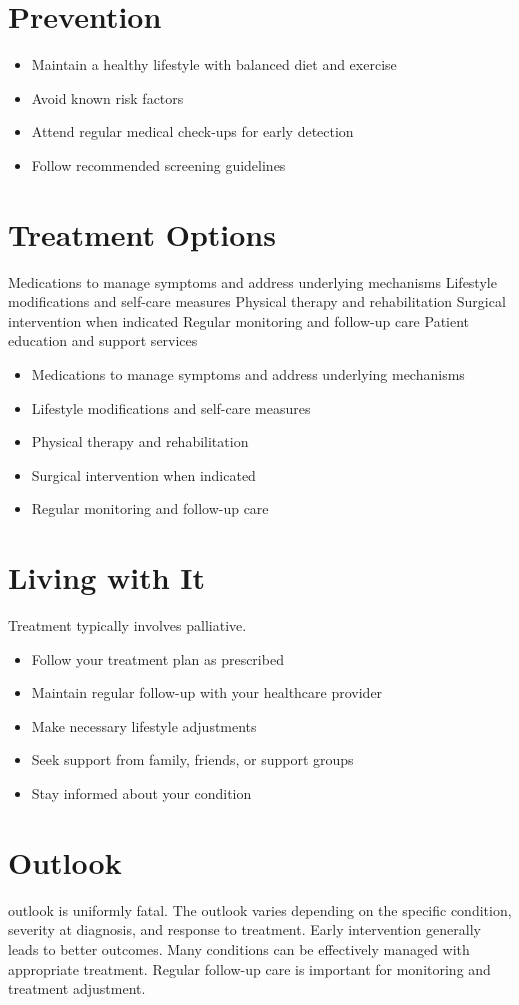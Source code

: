 \section{Prevention}
\begin{itemize}[noitemsep]
  \item Maintain a healthy lifestyle with balanced diet and exercise
  \item Avoid known risk factors
  \item Attend regular medical check-ups for early detection
  \item Follow recommended screening guidelines
\end{itemize}
\section{Treatment Options}
Medications to manage symptoms and address underlying mechanisms Lifestyle modifications and self-care measures Physical therapy and rehabilitation Surgical intervention when indicated Regular monitoring and follow-up care Patient education and support services

\begin{itemize}[noitemsep]
  \item Medications to manage symptoms and address underlying mechanisms
  \item Lifestyle modifications and self-care measures
  \item Physical therapy and rehabilitation
  \item Surgical intervention when indicated
  \item Regular monitoring and follow-up care
\end{itemize}
\section{Living with It}
Treatment typically involves palliative.

\begin{itemize}[noitemsep]
  \item Follow your treatment plan as prescribed
  \item Maintain regular follow-up with your healthcare provider
  \item Make necessary lifestyle adjustments
  \item Seek support from family, friends, or support groups
  \item Stay informed about your condition
\end{itemize}
\section{Outlook}
outlook is uniformly fatal. The outlook varies depending on the specific condition, severity at diagnosis, and response to treatment. Early intervention generally leads to better outcomes. Many conditions can be effectively managed with appropriate treatment. Regular follow-up care is important for monitoring and treatment adjustment.
